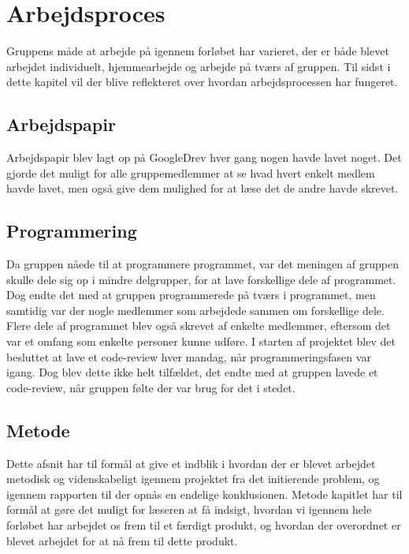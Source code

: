 \chapter{Arbejdsproces}\label{Arbejdsproces}
Gruppens måde at arbejde på igennem forløbet har varieret, der er både blevet arbejdet individuelt, hjemmearbejde og arbejde på tværs af gruppen. Til sidst i dette kapitel vil der blive reflekteret over hvordan arbejdsprocessen har fungeret.


\section{Arbejdspapir}\label{Arbejdspapir}
Arbejdspapir blev lagt op på GoogleDrev hver gang nogen havde lavet noget. Det gjorde det muligt for alle gruppemedlemmer at se hvad hvert enkelt medlem havde lavet, men også give dem mulighed for at læse det de andre havde skrevet.

\section{Programmering}\label{Programmering}

Da gruppen nåede til at programmere programmet, var det meningen af gruppen skulle dele sig op i mindre delgrupper, for at lave forskellige dele af programmet. Dog endte det med at gruppen programmerede på tværs i programmet, men samtidig var der nogle medlemmer som arbejdede sammen om forskellige dele. Flere dele af programmet blev også skrevet af enkelte medlemmer, eftersom det var et omfang som enkelte personer kunne udføre. I starten af projektet blev det besluttet at lave et code-review hver mandag, når programmeringsfasen var igang. Dog blev dette ikke helt tilfældet, det endte med at gruppen lavede et code-review, når gruppen følte der var brug for det i stedet. 


\section{Metode}\label{Metode}

Dette afsnit har til formål at give et indblik i hvordan der er blevet arbejdet metodisk og videnskabeligt igennem projektet fra det initierende problem, og igennem rapporten til der opnås en endelige konklusionen. Metode kapitlet har til formål at gøre det muligt for læseren at få indsigt, hvordan vi igennem hele forløbet har arbejdet os frem til et færdigt produkt, og hvordan der overordnet er blevet arbejdet for at nå frem til dette produkt. 

